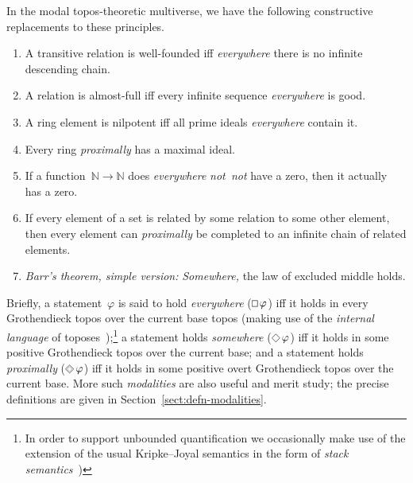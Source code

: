 \documentclass[envcountsect,envcountsame,runningheads]{llncs}
\newcommand{\NN}{\mathbb{N}}
\renewcommand{\_}{\mathpunct{.}\,}
\newcommand{\notnot}{\emph{not~not}\xspace}
\DeclareMathOperator{\possible}{\text{\tikz[scale=.6ex/1cm,baseline=-.6ex,rotate=45,line width=.1ex]{\draw (-1,-1) rectangle (1,1);}}}
\DeclareMathOperator{\necessary}{\text{\tikz[scale=.6ex/1cm,baseline=-.6ex,line width=.1ex]{\draw (-1,-1) rectangle (1,1);}}}
\DeclareMathOperator{\xpossible}{\text{\tikz[scale=.6ex/1cm,baseline=-.6ex,rotate=45,line width=.1ex]{\draw (-1,-1) rectangle (1,1); \draw[very thin] (-.6,-.6) rectangle (.6,.6);}}}
\newcommand{\?}{\,{:}\,}
\begin{document}
In the modal topos-theoretic multiverse, we have the following constructive replacements to these principles.
\begin{enumerate}
\item A transitive relation is well-founded iff \emph{everywhere} there is no infinite descending
chain.
\item A relation is almost-full iff every infinite sequence \emph{everywhere} is good.
\item A ring element is nilpotent iff all prime
ideals \emph{everywhere} contain it.
\item Every ring \emph{proximally} has a maximal ideal.
\item If a function~$\NN \to \NN$ does \emph{everywhere} \notnot have
a zero, then it actually has a zero.
\item If every element of a set is related by some relation to some other
element, then every element can \emph{proximally} be completed to an infinite chain
of related elements.
\item \emph{Barr's theorem, simple version:} \emph{Somewhere,} the law of
excluded middle holds.
\end{enumerate}

Briefly, a statement~$\varphi$ is said to hold \emph{everywhere}
($\necessary\varphi$) iff it holds in every Grothendieck topos over the
current base topos (making use of the \emph{internal language} of
toposes~\cite{borceux:handbook3,streicher:ctcl,maietti:modular});\footnote{In order to support unbounded quantification we occasionally make use of the extension of the usual Kripke--Joyal semantics in the form of \emph{stack semantics}~\cite{shulman:stack-semantics})} a statement holds \emph{somewhere} ($\possible\varphi$)
iff it holds in some positive Grothendieck topos over the current base; and a
statement holds \emph{proximally} ($\xpossible\varphi$) iff it holds in
some positive overt Grothendieck topos over the current base. More such
\emph{modalities} are also useful and merit study; the precise definitions are
given in Section~\ref{sect:defn-modalities}.
\end{document}
